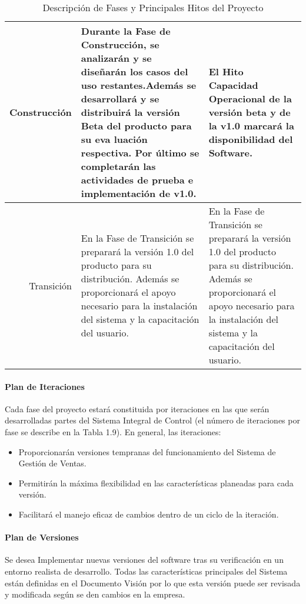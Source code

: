 \documentclass[a4paper,11pt, spanish]{report}
\begin{document}
{{{{{{{{{{\begin{table}[H]
\begin{tabularx}{\textwidth}{r|X|X}
            Construcción & Durante la Fase de Construcción, se analizarán y se diseñarán los casos del uso restantes.Además se desarrollará y se distribuirá la versión Beta del producto para su eva luación respectiva. Por último se completarán las actividades de prueba e implementación de v1.0.  & El Hito Capacidad Operacional de la versión beta y de la v1.0 marcará la disponibilidad del Software. \\ \hline
            Transición & En la Fase de Transición se preparará la versión 1.0 del producto para su distribución. Además se proporcionará el apoyo necesario para la instalación del sistema y la capacitación del usuario. & En la Fase de Transición se preparará la versión 1.0 del producto para su distribución. Además se proporcionará el apoyo necesario para la instalación del sistema y la capacitación del usuario.
            \end{tabularx}
            \caption{Descripción de Fases y Principales Hitos del Proyecto}
            \end {table}

            \paragraph{Plan de Iteraciones}

              Cada fase del proyecto estará constituida por iteraciones en las que serán desarrolladas partes del Sistema Integral de Control (el número de iteraciones por fase se describe en la Tabla 1.9). En general, las iteraciones:
                \begin{itemize}
                \item Proporcionarán versiones tempranas del funcionamiento del Sistema de Gestión de Ventas.
                \item Permitirán la máxima flexibilidad en las características planeadas para cada versión.
                \item Facilitará el manejo eficaz de cambios dentro de un ciclo de la iteración.
                \end{itemize}
            \paragraph{Plan de Versiones}

            Se desea Implementar nuevas versiones del software tras su verificación en un entorno realista de desarrollo. Todas las características principales del Sistema están definidas en el Documento Visión por lo que esta versión puede ser revisada y modificada según se den cambios en la empresa.

}}}}}}}}}}
\end{document}
